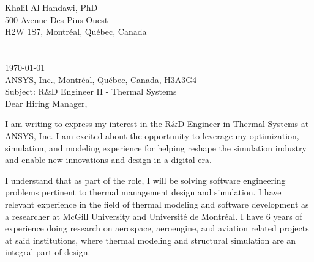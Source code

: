 \documentclass[12pt]{article} %
\begin{document}

Khalil Al Handawi, PhD\\
500 Avenue Des Pins Ouest\\
H2W 1S7, Montr\'{e}al, Qu\'{e}bec, Canada\\
\faPhone~~\cvnumberphone\\
\faEnvelope~~\href{mailto:\cvmail}{\cvmail}\\

\today\\

ANSYS, Inc., Montr\'{e}al, Qu\'{e}bec, Canada, H3A3G4\\
Subject: R\&D Engineer II - Thermal Systems\\[6pt]


Dear Hiring Manager,

\medskip %

I am writing to express my interest in the R\&D Engineer in Thermal Systems at ANSYS, Inc. I am excited about the opportunity to leverage my optimization, simulation, and modeling experience for helping reshape the simulation industry and enable new innovations and design in a digital era.

\medskip %

I understand that as part of the role, I will be solving software engineering problems pertinent to thermal management design and simulation. I have relevant experience in the field of thermal modeling and software development as a researcher at McGill University and Universit\'{e} de Montr\'{e}al. I have 6 years of experience doing research on aerospace, aeroengine, and aviation related projects at said institutions, where thermal modeling and structural simulation are an integral part of design.

\medskip %
\end{document}

